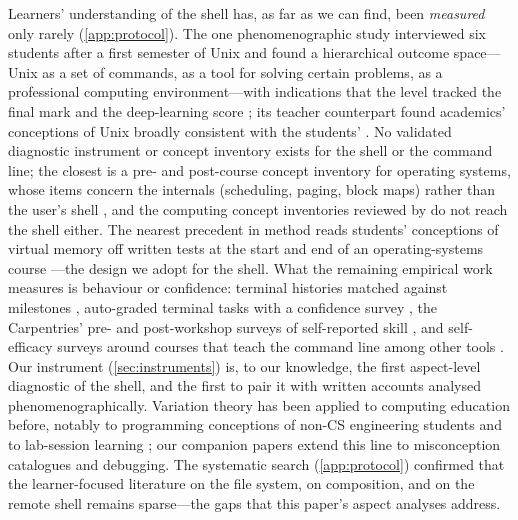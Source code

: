 Learners' understanding of the shell has, as far as we can find, been
\emph{measured} only rarely (\cref{app:protocol}).
The one phenomenographic study interviewed six students after a first
semester of Unix and found a hierarchical outcome space---Unix as a set
of commands, as a tool for solving certain problems, as a professional
computing environment---with indications that the level tracked the
final mark and the deep-learning score \autocite{DoyleLister2006Unix};
its teacher counterpart found academics' conceptions of Unix broadly
consistent with the students' \autocite{DoyleLister2007WhyUnix}.
No validated diagnostic instrument or concept inventory exists for the
shell or the command line; the closest is a pre- and post-course concept
inventory for operating systems, whose items concern the internals
(scheduling, paging, block maps) rather than the user's shell
\autocite{WebbTaylor2014OSCI}, and the computing concept inventories
reviewed by \textcite{Taylor2014CI} do not reach the shell either.
The nearest precedent in method reads students' conceptions of virtual
memory off written tests at the start and end of an operating-systems
course \autocite{Pamplona2024VirtualMemory}---the design we adopt for
the shell.
What the remaining empirical work measures is behaviour or
confidence: terminal histories matched against milestones
\autocite{Mirkovic2020Terminal}, auto-graded terminal tasks with a
confidence survey \autocite{BaileyZilles2019uAssign}, the
Carpentries' pre- and post-workshop surveys of self-reported skill
\autocite{Jordan2018Carpentry}, and self-efficacy surveys around
courses that teach the command line among other tools
\autocite{Gilson2022MissingCSClass}.
Our instrument (\cref{sec:instruments}) is, to our knowledge, the first
aspect-level diagnostic of the shell, and the first to pair it with
written accounts analysed phenomenographically.
Variation theory has been applied to computing education before, notably to
programming conceptions of non-CS engineering students
\autocite{ThuneEckerdal2009Variation} and to lab-session learning
\autocite{ThuneEckerdal2018Lab}; our companion papers
\autocite{VTProgMisconceptions,VTDebug} extend this line to misconception
catalogues and debugging.
The systematic search (\cref{app:protocol}) confirmed that the
learner-focused literature on the file system, on composition, and on the
remote shell remains sparse---the gaps that this paper's aspect analyses
address.
